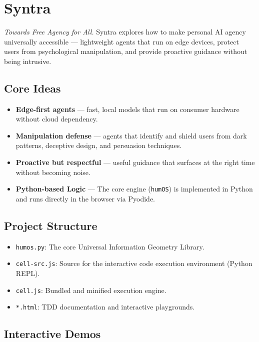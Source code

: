 \documentclass[12pt,a4paper]{article}
\providecommand{\tightlist}{\setlength{\itemsep}{0pt}\setlength{\parskip}{0pt}}
\begin{document}
\section{Syntra}\label{syntra}

\emph{Towards Free Agency for All.} Syntra explores how to make personal
AI agency universally accessible --- lightweight agents that run on edge
devices, protect users from psychological manipulation, and provide
proactive guidance without being intrusive.

\subsection{Core Ideas}\label{core-ideas}

\begin{itemize}
\tightlist
\item
  \textbf{Edge-first agents} --- fast, local models that run on consumer
  hardware without cloud dependency.
\item
  \textbf{Manipulation defense} --- agents that identify and shield
  users from dark patterns, deceptive design, and persuasion techniques.
\item
  \textbf{Proactive but respectful} --- useful guidance that surfaces at
  the right time without becoming noise.
\item
  \textbf{Python-based Logic} --- The core engine (\texttt{humOS}) is
  implemented in Python and runs directly in the browser via Pyodide.
\end{itemize}

\subsection{Project Structure}\label{project-structure}

\begin{itemize}
\tightlist
\item
  \texttt{humos.py}: The core Universal Information Geometry Library.
\item
  \texttt{cell-src.js}: Source for the interactive code execution
  environment (Python REPL).
\item
  \texttt{cell.js}: Bundled and minified execution engine.
\item
  \texttt{*.html}: TDD documentation and interactive playgrounds.
\end{itemize}

\subsection{Interactive Demos}\label{interactive-demos}
\end{document}
